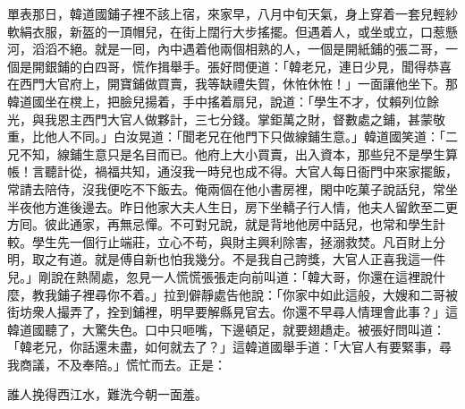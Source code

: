 單表那日，韓道國鋪子裡不該上宿，來家早，八月中旬天氣，身上穿着一套兒輕紗軟絹衣服，新盔的一頂帽兒，在街上闊行大步搖擺。但遇着人，或坐或立，口惹懸河，滔滔不絕。就是一囘，內中遇着他兩個相熟的人，一個是開紙鋪的張二哥，一個是開銀鋪的白四哥，慌作揖舉手。張好問便道：「韓老兄，連日少見，聞得恭喜在西門大官府上，開寶鋪做買賣，我等缺禮失賀，休恠休恠！」一面讓他坐下。那韓道國坐在櫈上，把臉兒揚着，手中搖着扇兒，說道：「學生不才，仗賴列位餘光，與我恩主西門大官人做夥計，三七分錢。掌鉅萬之財，督數處之鋪，甚蒙敬重，比他人不同。」白汝晃道：「聞老兄在他門下只做線鋪生意。」韓道國笑道：「二兄不知，線鋪生意只是名目而已。他府上大小買賣，出入資本，那些兒不是學生算帳！言聽計從，禍福共知，通沒我一時兒也成不得。大官人每日衙門中來家擺飯，常請去陪侍，沒我便吃不下飯去。俺兩個在他小書房裡，閑中吃菓子說話兒，常坐半夜他方進後邊去。昨日他家大夫人生日，房下坐轎子行人情，他夫人留飲至二更方囘。彼此通家，再無忌憚。不可對兄說，就是背地他房中話兒，也常和學生計較。學生先一個行止端莊，立心不苟，與財主興利除害，拯溺救焚。凡百財上分明，取之有道。就是傅自新也怕我幾分。不是我自己誇獎，大官人正喜我這一件兒。」剛說在熱鬧處，忽見一人慌慌張張走向前叫道：「韓大哥，你還在這裡說什麼，教我鋪子裡尋你不着。」{}拉到僻靜處告他說：「你家中如此這般，大嫂和二哥被街坊衆人撮弄了，拴到鋪裡，明早要解縣見官去。你還不早尋人情理會此事？」這韓道國聽了，大驚失色。口中只咂嘴，下邊頓足，就要翅趫走。被張好問叫道：「韓老兄，你話還未盡，如何就去了？」這韓道國舉手道：「大官人有要緊事，尋我商議，不及奉陪。」慌忙而去。正是：

\begin{myquote} 
誰人挽得西江水，難洗今朝一面羞。
\end{myquote} 

